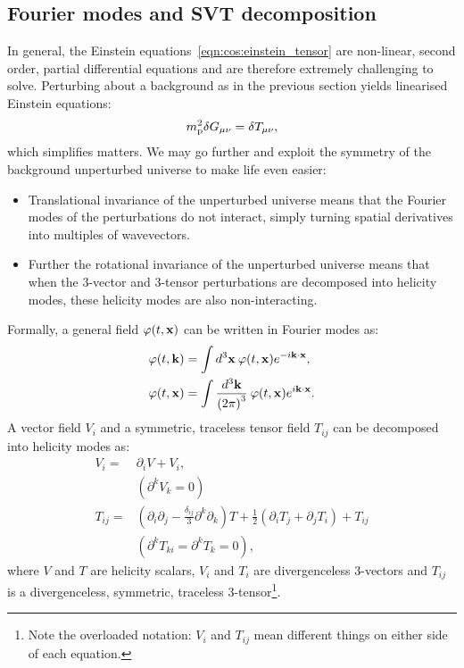 \subsection{Fourier modes and SVT decomposition}
In general, the Einstein equations~\eqref{eqn:cos:einstein_tensor} are non-linear, second order, partial differential equations and are therefore extremely challenging to solve. Perturbing about a background as in the previous section yields linearised Einstein equations:
\begin{equation}
 m_{\mathrm{p}}^2 \delta G_{\mu\nu} = \delta T_{\mu\nu},
  \label{eqn:cos:einsteins_equations_perturb}
\end{equation}
which simplifies matters.  
We may go further and exploit the symmetry of the background unperturbed universe to make life even easier:
\begin{itemize}
  \item Translational invariance of the unperturbed universe means that the Fourier modes of the perturbations do not interact, simply turning spatial derivatives into multiples of wavevectors. 
  \item Further the rotational invariance of  the unperturbed universe means that when the 3-vector and 3-tensor perturbations are decomposed into helicity modes, these helicity modes are also non-interacting.
\end{itemize}
Formally, a general field $\varphi(t,\mathbf{x})$ can be written in Fourier modes as:
\begin{align}
  \varphi(t,\mathbf{k}) &= \int d^3\mathbf{x}\: \varphi(t,\mathbf{x}) e^{-i\mathbf{k} \cdot \mathbf{x}},\\
  \varphi(t,\mathbf{x}) &= \int \frac{d^3\mathbf{k}}{{(2\pi)}^3}\: \varphi(t,\mathbf{x}) e^{i\mathbf{k} \cdot \mathbf{x}}.
\end{align}
A vector field $V_i$ and a symmetric, traceless tensor field $T_{ij}$ can be decomposed into helicity modes as:
\begin{align}
  V_i =& \partial_i V + V_i,   \nonumber\\
  &(\partial^k V_k=0) \\
  T_{ij} =& (\partial_i\partial_j - \frac{\delta_{ij}}{3}\partial^k\partial_k)T + \frac{1}{2}(\partial_i T_j + \partial_j T_i) + T_{ij} \nonumber\\ 
  &(\partial^k T_{ki} = \partial^k T_k = 0),
\end{align}
where $V$ and $T$ are helicity scalars, $V_i$ and $T_i$ are divergenceless 3-vectors and $T_{ij}$ is a divergenceless, symmetric, traceless 3-tensor\footnote{Note the overloaded notation: $V_i$ and $T_{ij}$ mean different things on either side of each equation.}.

